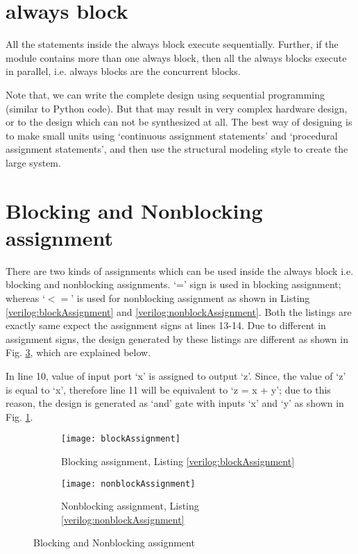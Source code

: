\section{always block}
All the statements inside the always block execute sequentially. Further, if the module contains more than one always block, then all the always blocks execute in parallel, i.e. always blocks are the concurrent blocks. 

\begin{noNumBox}
	Note that, we can write the complete design using sequential programming (similar to Python code). But that may result in very complex hardware design, or to the design which can not be synthesized at all. The best way of designing is to make small units using `continuous assignment statements' and `procedural assignment statements', and then use the structural modeling style to create the large system. 
\end{noNumBox}

\section{Blocking and Nonblocking assignment}
There are two kinds of assignments which can be used inside the always block i.e. blocking and nonblocking assignments. `=' sign is used in blocking assignment; whereas `$<=$' is used for nonblocking assignment as shown in Listing \ref{verilog:blockAssignment} and \ref{verilog:nonblockAssignment}. Both the listings are exactly same expect the assignment signs at lines 13-14. Due to different in assignment signs, the design generated by these listings are different as shown in Fig. \ref{fig:blockingNonblockingAssg}, which are explained below.

\begin{explanation}
	In line 10, value of input port `x' is assigned to output `z'. Since, the value of `z' is equal to `x', therefore line 11 will be equivalent to `z = x + y'; due to this reason, the design is generated as `and' gate with inputs `x' and `y' as shown in Fig. \ref{fig:blockAssignment}.
\end{explanation}




\begin{figure}[t!]
	\centering
	\begin{subfigure}[t]{0.5\textwidth}
		\centering
		\texttt{[image: blockAssignment]}
		\caption{Blocking assignment, Listing \ref{verilog:blockAssignment}}
		\label{fig:blockAssignment}
	\end{subfigure}%
	\begin{subfigure}[t]{0.5\textwidth}
		\centering
		\texttt{[image: nonblockAssignment]}
		\caption{Nonblocking assignment, Listing \ref{verilog:nonblockAssignment}}
		\label{fig:nonblockAssignment}
	\end{subfigure}	
	\caption{Blocking and Nonblocking assignment}
	\label{fig:blockingNonblockingAssg}%
\end{figure}

